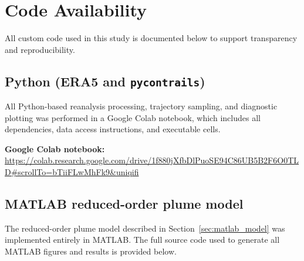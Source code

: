 \documentclass[11pt]{article}
\begin{document}

\section{Code Availability}
\label{sec:code}

All custom code used in this study is documented below to support transparency and
reproducibility.

\subsection{Python (ERA5 and \texttt{pycontrails})}

All Python-based reanalysis processing, trajectory sampling, and diagnostic plotting
was performed in a Google Colab notebook, which includes all dependencies, data access
instructions, and executable cells.

\noindent
\textbf{Google Colab notebook:}  
\url{https://colab.research.google.com/drive/1f880jXfbDlPuoSE94C86UB5B2F6O0TLD#scrollTo=bTiiFLwMhFk9&uniqifi}

\subsection{MATLAB reduced-order plume model}

The reduced-order plume model described in Section~\ref{sec:matlab_model} was implemented
entirely in MATLAB. The full source code used to generate all MATLAB figures and results
is provided below.
\end{document}
